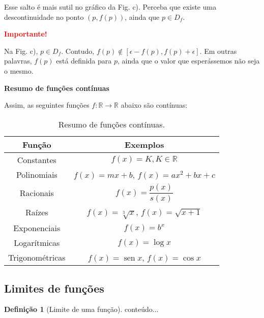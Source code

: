 \documentclass[12pt,openright,twoside,a4paper]{article}
\theoremstyle{definition}
\newtheorem{definition}{Definição}[section]
\renewcommand{\sin}{\operatorname{sen}} %
\begin{document}
	Esse salto é mais sutil no gráfico da Fig. c). Perceba que existe uma descontinuidade no ponto $(p,f(p))$, ainda que $p \in D_f$.
	
	\begin{snugshade}
		\textbf{\textcolor{red}{Importante!}}
		
		Na Fig. c), $p \in D_f$. Contudo, $f(p) \notin \left[ \epsilon - f(p), f(p) + \epsilon \right]$. Em outras palavras, $f(p)$ está definida para $p$, ainda que o valor que esperássemos não seja o mesmo.
	\end{snugshade}
	
		\textbf{Resumo de funções contínuas}
	
		Assim, as seguintes funções $f: \mathbb{R} \longrightarrow \mathbb{R}$ abaixo são contínuas:
		
		\begin{table}[h]
			\caption{Resumo de funções contínuas.}
			\centering
			\begin{tabular}[t]{|c|c|}
				\hline
				Função & Exemplos \\
				\hline
				Constantes & $f(x) = K, K \in \mathbb{R}$ \\
				\hline
				Polinomiais & $f(x) = mx + b$, $f(x) = ax^2 + bx + c$\\
				\hline
				Racionais & $f(x) = \dfrac{p(x)}{s(x)}$\\
				\hline
				Raízes & $f(x) = \sqrt[3]{x}$, $f(x) = \sqrt{x+1}$\\
				\hline
				Exponenciais & $f(x) = b^x$\\
				\hline
				Logarítmicas & $f(x) = \log x$\\
				\hline
				Trigonométricas & $f(x) = \sin x $, $f(x) = \cos x$\\
				\hline
			\end{tabular}
		\end{table}
	
	\subsection{Limites de funções}
	
	\begin{definition}[Limite de uma função]
		conteúdo...
	\end{definition}
	
\end{document}
